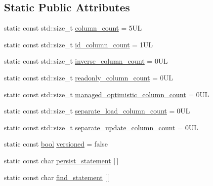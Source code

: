 \subsection*{Static Public Attributes}
\begin{DoxyCompactItemize}
\item 
static const std\+::size\+\_\+t \hyperlink{classodb_1_1access_1_1object__traits__impl_3_01_1_1_edge_00_01id__pgsql_01_4_aea0dabff8aee7674a2421114b2ad3ba7}{column\+\_\+count} = 5\+U\+L
\item 
static const std\+::size\+\_\+t \hyperlink{classodb_1_1access_1_1object__traits__impl_3_01_1_1_edge_00_01id__pgsql_01_4_ae9929cb4aa223adcb1f26f3f5b72a180}{id\+\_\+column\+\_\+count} = 1\+U\+L
\item 
static const std\+::size\+\_\+t \hyperlink{classodb_1_1access_1_1object__traits__impl_3_01_1_1_edge_00_01id__pgsql_01_4_aa888e6529f015cc8191ddce9ae0a7d40}{inverse\+\_\+column\+\_\+count} = 0\+U\+L
\item 
static const std\+::size\+\_\+t \hyperlink{classodb_1_1access_1_1object__traits__impl_3_01_1_1_edge_00_01id__pgsql_01_4_a6ba1556d4ecef7c344b730d922d694de}{readonly\+\_\+column\+\_\+count} = 0\+U\+L
\item 
static const std\+::size\+\_\+t \hyperlink{classodb_1_1access_1_1object__traits__impl_3_01_1_1_edge_00_01id__pgsql_01_4_aabfa2d98f7aa396febabfc9a4db0202f}{managed\+\_\+optimistic\+\_\+column\+\_\+count} = 0\+U\+L
\item 
static const std\+::size\+\_\+t \hyperlink{classodb_1_1access_1_1object__traits__impl_3_01_1_1_edge_00_01id__pgsql_01_4_a41be443206c31a3f64d3aca2b1c942bb}{separate\+\_\+load\+\_\+column\+\_\+count} = 0\+U\+L
\item 
static const std\+::size\+\_\+t \hyperlink{classodb_1_1access_1_1object__traits__impl_3_01_1_1_edge_00_01id__pgsql_01_4_a0dcde3260ed617e1802ca0bf4559e918}{separate\+\_\+update\+\_\+column\+\_\+count} = 0\+U\+L
\item 
static const \hyperlink{classodb_1_1access_1_1object__traits_3_01_1_1_edge_01_4_a16e9c480b5803d3dd980cd934f04dd7b}{bool} \hyperlink{classodb_1_1access_1_1object__traits__impl_3_01_1_1_edge_00_01id__pgsql_01_4_a01011a6335bfa0796caad6e584a03dec}{versioned} = false
\item 
static const char \hyperlink{classodb_1_1access_1_1object__traits__impl_3_01_1_1_edge_00_01id__pgsql_01_4_a25162cf0cd61b69348cb4765a218ac4d}{persist\+\_\+statement} \mbox{[}$\,$\mbox{]}
\item 
static const char \hyperlink{classodb_1_1access_1_1object__traits__impl_3_01_1_1_edge_00_01id__pgsql_01_4_a7a6a7de164085927336265d10b822722}{find\+\_\+statement} \mbox{[}$\,$\mbox{]}

\end{DoxyCompactItemize}
